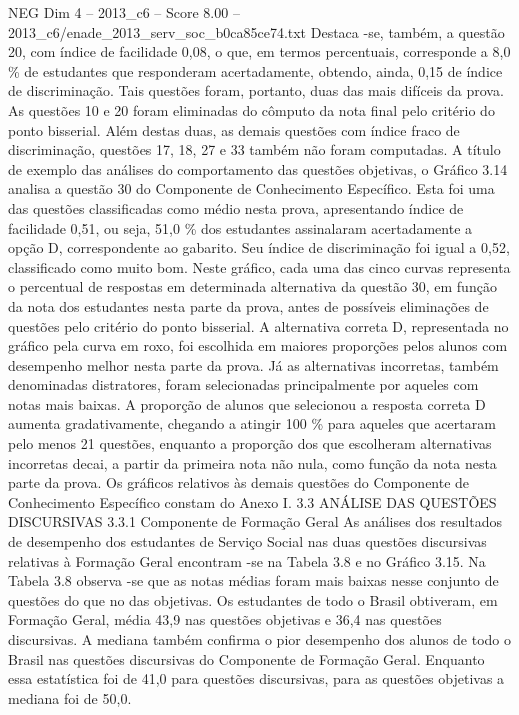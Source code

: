 \begin{textsample}{NEG Dim 4 – 2013\_c6 – Score 8.00 – 2013\_c6/enade\_2013\_serv\_soc\_b0ca85ce74.txt}
Destaca -se, também, a questão 20, com índice de facilidade 0,08, o que, em termos percentuais, corresponde a 8,0 \% de estudantes que responderam acertadamente, obtendo, ainda, 0,15 de índice de discriminação.
Tais questões foram, portanto, duas das mais difíceis da prova.
As questões 10 e 20 foram eliminadas do cômputo da nota final pelo critério do ponto bisserial.
Além destas duas, as demais questões com índice fraco de discriminação, questões 17, 18, 27 e 33 também não foram computadas.
A título de exemplo das análises do comportamento das questões objetivas, o Gráfico 3.14 analisa a questão 30 do Componente de Conhecimento Específico.
Esta foi uma das questões classificadas como médio nesta prova, apresentando índice de facilidade 0,51, ou seja, 51,0 \% dos estudantes assinalaram acertadamente a opção D, correspondente ao gabarito.
Seu índice de discriminação foi igual a 0,52, classificado como muito bom.
Neste gráfico, cada uma das cinco curvas representa o percentual de respostas em determinada alternativa da questão 30, em função da nota dos estudantes nesta parte da prova, antes de possíveis eliminações de questões pelo critério do ponto bisserial.
A alternativa correta D, representada no gráfico pela curva em roxo, foi escolhida em maiores proporções pelos alunos com desempenho melhor nesta parte da prova.
Já as alternativas incorretas, também denominadas distratores, foram selecionadas principalmente por aqueles com notas mais baixas.
A proporção de alunos que selecionou a resposta correta D aumenta gradativamente, chegando a atingir 100 \% para aqueles que acertaram pelo menos 21 questões, enquanto a proporção dos que escolheram alternativas incorretas decai, a partir da primeira nota não nula, como função da nota nesta parte da prova.
Os gráficos relativos às demais questões do Componente de Conhecimento Específico constam do Anexo I. 3.3 ANÁLISE DAS QUESTÕES DISCURSIVAS 3.3.1 Componente de Formação Geral As análises dos resultados de desempenho dos estudantes de Serviço Social nas duas questões discursivas relativas à Formação Geral encontram -se na Tabela 3.8 e no Gráfico 3.15.
Na Tabela 3.8 observa -se que as notas médias foram mais baixas nesse conjunto de questões do que no das objetivas.
Os estudantes de todo o Brasil obtiveram, em Formação Geral, média 43,9 nas questões objetivas e 36,4 nas questões discursivas.
A mediana também confirma o pior desempenho dos alunos de todo o Brasil nas questões discursivas do Componente de Formação Geral.
Enquanto essa estatística foi de 41,0 para questões discursivas, para as questões objetivas a mediana foi de 50,0.

\end{textsample}
